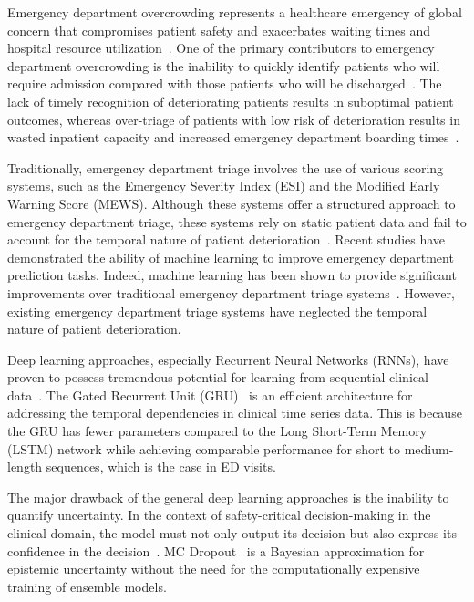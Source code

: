 \documentclass[runningheads]{llncs}
\begin{document}
Emergency department overcrowding represents a healthcare emergency of global concern that compromises patient safety and exacerbates waiting times and hospital resource utilization~\cite{Hoot2008}. One of the primary contributors to emergency department overcrowding is the inability to quickly identify patients who will require admission compared with those patients who will be discharged~\cite{Peck2012}. The lack of timely recognition of deteriorating patients results in suboptimal patient outcomes, whereas over-triage of patients with low risk of deterioration results in wasted inpatient capacity and increased emergency department boarding times~\cite{Morley2018}.

Traditionally, emergency department triage involves the use of various scoring systems, such as the Emergency Severity Index (ESI) and the Modified Early Warning Score (MEWS). Although these systems offer a structured approach to emergency department triage, these systems rely on static patient data and fail to account for the temporal nature of patient deterioration~\cite{Levin2018}. Recent studies have demonstrated the ability of machine learning to improve emergency department prediction tasks. Indeed, machine learning has been shown to provide significant improvements over traditional emergency department triage systems~\cite{Raita2019, Hong2018}. However, existing emergency department triage systems have neglected the temporal nature of patient deterioration.

Deep learning approaches, especially Recurrent Neural Networks (RNNs), have proven to possess tremendous potential for learning from sequential clinical data~\cite{Rajkomar2018, Choi2016}. The Gated Recurrent Unit (GRU)~\cite{Cho2014} is an efficient architecture for addressing the temporal dependencies in clinical time series data. This is because the GRU has fewer parameters compared to the Long Short-Term Memory (LSTM) network while achieving comparable performance for short to medium-length sequences, which is the case in ED visits.

The major drawback of the general deep learning approaches is the inability to quantify uncertainty. In the context of safety-critical decision-making in the clinical domain, the model must not only output its decision but also express its confidence in the decision~\cite{Begoli2019}. MC Dropout~\cite{Gal2016} is a Bayesian approximation for epistemic uncertainty without the need for the computationally expensive training of ensemble models.
\end{document}
